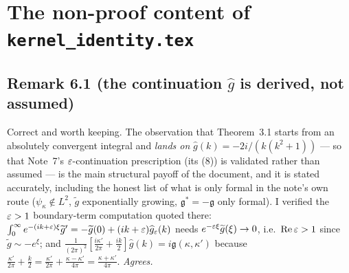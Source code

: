 \documentclass[11pt]{article}
\newcommand{\gt}{\widetilde g}\newcommand{\gh}{\widehat g}\newcommand{\gfr}{\mathfrak g}
\newcommand{\KI}{\texttt{kernel\_identity.tex}}\newcommand{\NOTE}{\texttt{universality\_normalization.tex}}
\begin{document}
\section{The non-proof content of \KI}\label{sec:rest}

\subsection{Remark 6.1 (the continuation \(\gh\) is derived, not assumed)}
Correct and worth keeping.  The observation that Theorem~3.1 starts from an absolutely convergent
integral and \emph{lands on} \(\gh(k)=-2i/(k(k^2+1))\) --- so that Note~7's \(\varepsilon\)-continuation
prescription (its (8)) is validated rather than assumed --- is the main structural payoff of the
document, and it is stated accurately, including the honest list of what is only formal in the
note's own route (\(\psi_\kappa\notin L^2\), \(\gt\) exponentially growing, \(\gfr^*=-\gfr\) only
formal).  I verified the \(\varepsilon>1\) boundary-term computation quoted there:
\(\int_0^\infty e^{-(ik+\eps)\xi}\gt'=-\gt(0)+(ik+\eps)\gh_\eps(k)\) needs
\(e^{-\eps\xi}\gt(\xi)\to0\), i.e.\ \(\operatorname{Re}\varepsilon>1\) since \(\gt\sim-e^\xi\); and
\(\frac1{(2\pi)^2}[\frac{i\kappa'}{2\pi}+\frac{ik}2]\gh(k)=i\gfr(\kappa,\kappa')\) because
\(\frac{\kappa'}{2\pi}+\frac k2=\frac{\kappa'}{2\pi}+\frac{\kappa-\kappa'}{4\pi}
=\frac{\kappa+\kappa'}{4\pi}\).  \emph{Agrees.}
\end{document}

